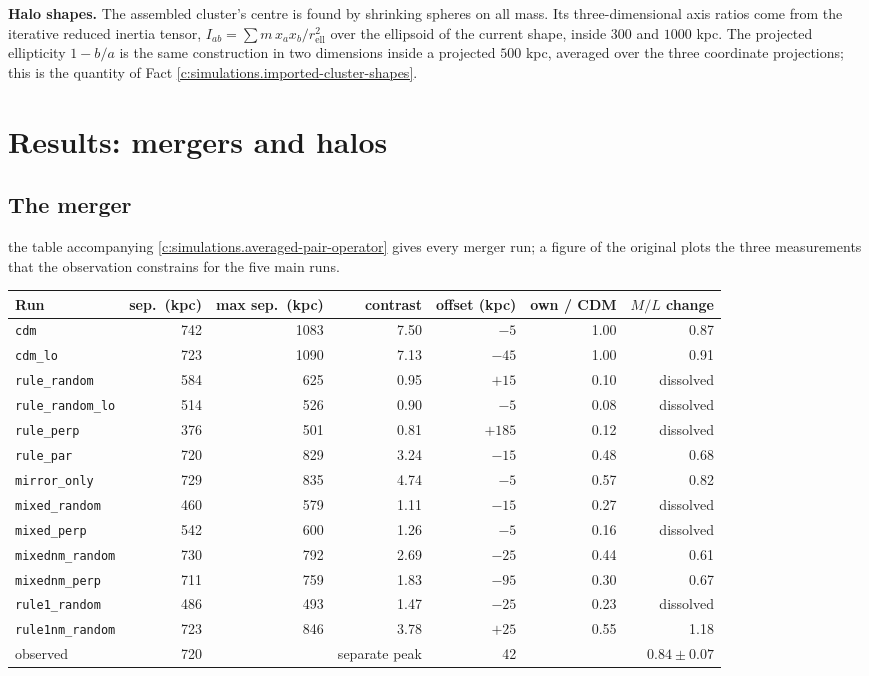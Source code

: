 \documentclass[11pt]{article}
\theoremstyle{definition}
\theoremstyle{plain}
\begin{document}
\label{c:note.simulations.setting-measurements-4}
\textbf{Halo shapes.} The assembled cluster's centre is found by shrinking spheres on all mass. Its three-dimensional axis ratios come from the iterative reduced inertia tensor, $I_{ab} = \sum m\,x_{a}x_{b}/r_{\mathrm{ell}}^{2}$ over the ellipsoid of the current shape, inside $300$ and $1000$ kpc. The projected ellipticity $1 - b/a$ is the same construction in two dimensions inside a projected $500$ kpc, averaged over the three coordinate projections; this is the quantity of Fact \ref{c:simulations.imported-cluster-shapes}.

\section{Results: mergers and halos}

\subsection*{The merger}
\label{c:note.simulations.setting-merger-2}
the table accompanying \ref{c:simulations.averaged-pair-operator} gives every merger run; a figure of the original plots the three measurements that the observation constrains for the five main runs.

\centering  
\begin{tabular}{@{}lrrrrrr@{}}
\toprule
Run & sep.\ (kpc) & max sep.\ (kpc) & contrast & offset (kpc) & own / CDM & $M/L$ change \\
\midrule
\texttt{cdm} & 742 & 1083 & 7.50 & $-5$ & 1.00 & 0.87 \\
\texttt{cdm\_lo} & 723 & 1090 & 7.13 & $-45$ & 1.00 & 0.91 \\
\texttt{rule\_random} & 584 & 625 & 0.95 & $+15$ & 0.10 & dissolved \\
\texttt{rule\_random\_lo} & 514 & 526 & 0.90 & $-5$ & 0.08 & dissolved \\
\texttt{rule\_perp} & 376 & 501 & 0.81 & $+185$ & 0.12 & dissolved \\
\texttt{rule\_par} & 720 & 829 & 3.24 & $-15$ & 0.48 & 0.68 \\
\texttt{mirror\_only} & 729 & 835 & 4.74 & $-5$ & 0.57 & 0.82 \\
\texttt{mixed\_random} & 460 & 579 & 1.11 & $-15$ & 0.27 & dissolved \\
\texttt{mixed\_perp} & 542 & 600 & 1.26 & $-5$ & 0.16 & dissolved \\
\texttt{mixednm\_random} & 730 & 792 & 2.69 & $-25$ & 0.44 & 0.61 \\
\texttt{mixednm\_perp} & 711 & 759 & 1.83 & $-95$ & 0.30 & 0.67 \\
\texttt{rule1\_random} & 486 & 493 & 1.47 & $-25$ & 0.23 & dissolved \\
\texttt{rule1nm\_random} & 723 & 846 & 3.78 & $+25$ & 0.55 & 1.18 \\
\midrule
observed & 720 & & separate peak & 42\rlap{$^{\dagger}$} & & $0.84 \pm 0.07$\rlap{$^{*}$} \\
\bottomrule
\end{tabular}
\end{document}
